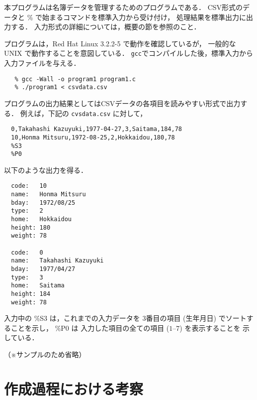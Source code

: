 \documentclass[a4j,11pt]{jarticle}
\begin{document}
本プログラムは名簿データを管理するためのプログラムである．
CSV形式のデータと \% で始まるコマンドを標準入力から受け付け，
処理結果を標準出力に出力する．
入力形式の詳細については，概要の節を参照のこと．

プログラムは，Red Hat Linux 3.2.2-5 で動作を確認しているが，
一般的な UNIX で動作することを意図している．
\verb|gcc|でコンパイルした後，標準入力から入力ファイルを与える．

{\fontsize{10pt}{11pt} \selectfont
 \begin{verbatim}
   % gcc -Wall -o program1 program1.c
   % ./program1 < csvdata.csv
 \end{verbatim}
}

プログラムの出力結果としてはCSVデータの各項目を読みやすい形式で出力する．
例えば，下記の \verb|cvsdata.csv| に対して，

{\fontsize{10pt}{11pt} \selectfont
 \begin{verbatim}
  0,Takahashi Kazuyuki,1977-04-27,3,Saitama,184,78
  10,Honma Mitsuru,1972-08-25,2,Hokkaidou,180,78
  %S3
  %P0
 \end{verbatim}
}

\noindent %
以下のような出力を得る．

{\fontsize{10pt}{11pt} \selectfont
 \begin{verbatim}
  code:   10
  name:   Honma Mitsuru
  bday:   1972/08/25
  type:   2
  home:   Hokkaidou
  height: 180
  weight: 78

  code:   0
  name:   Takahashi Kazuyuki
  bday:   1977/04/27
  type:   3
  home:   Saitama
  height: 184
  weight: 78
 \end{verbatim}
}

\noindent
入力中の
\%S3 は，これまでの入力データを
3番目の項目 (生年月日) でソートすることを示し，
\%P0 は 入力した項目の全ての項目 ($1$--$7$) を表示することを
示している．

（※サンプルのため省略）

\section{作成過程における考察}
\end{document}
